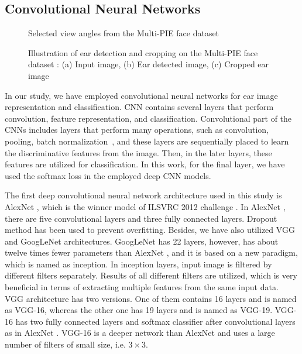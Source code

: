 \documentclass[11pt,journal,compsoc]{IEEEtran}
\begin{document}
\subsection{Convolutional Neural Networks}\label{subsec2.2}

\begin{figure*}[t]
	\caption{Selected view angles from the Multi-PIE face dataset \cite{Gross_2008_a, Gross_2008_b}}
	\label{Fig_multi_pie}
\end{figure*}

\begin{figure}[t]
	\caption{Illustration of ear detection and  cropping on the Multi-PIE face dataset \cite{Gross_2008_a, Gross_2008_b}: (a) Input image, (b) Ear detected image, (c) Cropped ear image}
	\label{fig_multi_crop}
\end{figure}

In our study, we have employed convolutional neural networks for ear image representation and classification. CNN contains several layers that perform convolution, feature representation, and classification. Convolutional part of the CNNs includes layers that perform many operations, such as convolution, pooling, batch normalization~\cite{Ioffe_2015}, and these layers are sequentially placed to learn the discriminative features from the image. Then, in the later layers, these features are utilized for classification. In this work, for the final layer, we have used the softmax loss in the employed deep CNN models.

The first deep convolutional neural network architecture used in this study is AlexNet \cite{Krizhevsky_2012}, which is the winner model of ILSVRC 2012 challenge \cite{Russakovsky_2015}. In AlexNet \cite{Krizhevsky_2012}, there are five convolutional layers and three fully connected layers. Dropout method \cite{Srivastava_2014} has been used to prevent overfitting. Besides, we have also utilized VGG~\cite{Simonyan_2014} and GoogLeNet \cite{Szegedy_2015} architectures. GoogLeNet \cite{Szegedy_2015} has 22 layers, however, has about twelve times fewer parameters than AlexNet \cite{Krizhevsky_2012}, and it is based on a new paradigm, which is named as inception. In inception layers, input image is filtered by different filters separately. Results of all different filters are utilized, which is very beneficial in terms of extracting multiple features from the same input data. VGG architecture has two versions. One of them contains 16 layers and is named as VGG-16, whereas the other one has 19 layers and is named as VGG-19. VGG-16 has two fully connected layers and softmax classifier after convolutional layers as in AlexNet \cite{Krizhevsky_2012}. VGG-16 \cite{Simonyan_2014} is a deeper network than AlexNet \cite{Krizhevsky_2012} and uses a large number of filters of small size, i.e. $3 \times 3$. 
\end{document}
